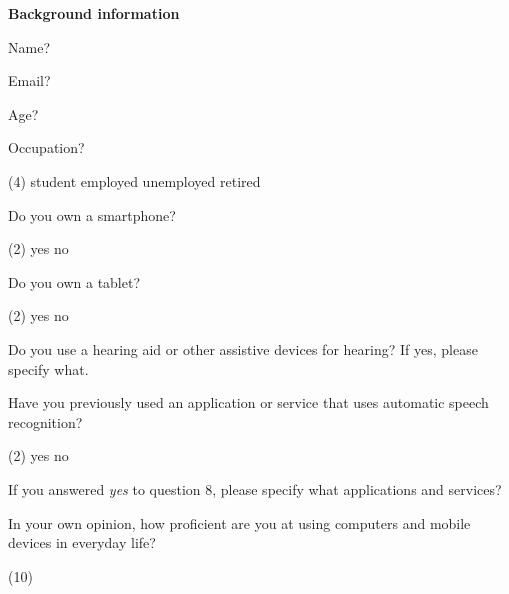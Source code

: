 \documentclass[english, 12pt, a4paper, pdftex, elec, utf8]{aaltothesis}
\begin{document}
{ \footnotesize %
    \noindent
    \hspace{0.35cm}
    \textbf{Background information}
    \vspace{0.15cm}
    \begin{questionnaire}
        \item Name?
        \item Email?
        \item Age?
        \item Occupation?
        \begin{tasks}[label-width = 2em](4)
            \task student
            \task employed
            \task unemployed
            \task retired
        \end{tasks}
        \item Do you own a smartphone?
        \begin{tasks}[label-width = 2em](2)
            \task yes
            \task no
        \end{tasks}
        \item Do you own a tablet?
        \begin{tasks}[label-width = 2em](2)
            \task yes
            \task no
        \end{tasks}
        \item Do you use a hearing aid or other assistive devices for hearing? If yes, please specify what.
        \item Have you previously used an application or service that uses automatic speech recognition?
        \begin{tasks}[label-width = 2em](2)
            \task yes
            \task no
        \end{tasks}
        \item If you answered \textit{yes} to question 8, please specify what applications and services?
        \item In your own opinion, how proficient are you at using computers and mobile devices in everyday life?
        \begin{tasks}[](10)

\end{tasks}
\end{questionnaire}}
\end{document}
